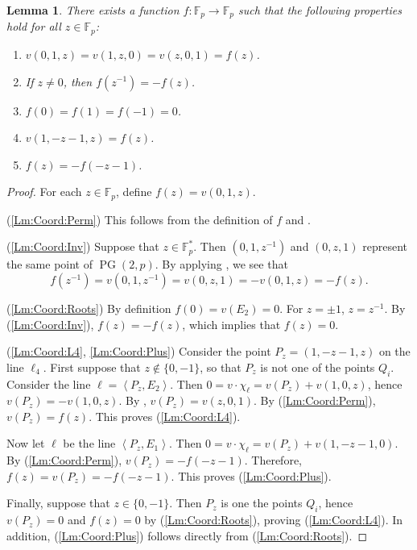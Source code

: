 \documentclass[12pt, a4paper]{article}
\newtheorem{lm}[thm]{Lemma}
\theoremstyle{definition}
\newcommand{\FF}{\mathbb F}
\newcommand{\vspan}[1]{\left \langle #1 \right \rangle}
\DeclareMathOperator{\PG}{PG}
\newcommand{\pg}{\PG}
\begin{document}
\begin{lm}
 \label{Lm:Coord}
 There exists a function $f: \FF_p \to \FF_p$ such that the following properties hold for all $z \in \FF_p$:
 \begin{enumerate}
  \item \label{Lm:Coord:Perm} $v(0,1,z) = v(1,z,0) = v(z,0,1) = f(z)$.
  \item \label{Lm:Coord:Inv} If $z \neq 0$, then $f(z^{-1}) = - f(z)$.
  \item \label{Lm:Coord:Roots} $f(0) = f(1) = f(-1) = 0$.
  \item \label{Lm:Coord:L4} $v(1,-z-1,z) = f(z)$.
  \item \label{Lm:Coord:Plus} $f(z) = -f(-z-1)$.
 \end{enumerate}
\end{lm}

\begin{proof}
 For each $z \in \FF_p$, define $f(z) = v(0,1,z)$.
 
 (\ref{Lm:Coord:Perm}) This follows from the definition of $f$ and .

 (\ref{Lm:Coord:Inv}) Suppose that $z \in \FF_p^*$.
 Then $(0,1,z^{-1})$ and $(0,z,1)$ represent the same point of $\pg(2,p)$.
 By applying , we see that
 \[
  f(z^{-1}) = v(0,1,z^{-1}) = v(0,z,1) = -v(0,1,z) = -f(z).
 \]

 (\ref{Lm:Coord:Roots}) By definition $f(0) = v(E_2) = 0$.
 For $z = \pm 1$, $z = z^{-1}$.
 By (\ref{Lm:Coord:Inv}), $f(z) = -f(z)$, which implies that $f(z) = 0$.

 (\ref{Lm:Coord:L4}, \ref{Lm:Coord:Plus})
 Consider the point $P_z = (1,-z-1,z)$ on the line $\ell_4$.
 First suppose that $z \notin \{0,-1\}$, so that $P_z$ is not one of the points $Q_i$.
 Consider the line $\ell = \vspan{P_z,E_2}$.
 Then $0 = v \cdot \chi_\ell = v(P_z) + v(1,0,z)$, hence $v(P_z) = -v(1,0,z)$.
 By , $v(P_z) = v(z,0,1)$.
 By (\ref{Lm:Coord:Perm}), $v(P_z) = f(z)$.
 This proves (\ref{Lm:Coord:L4}).
 
 Now let $\ell$ be the line $\vspan{P_z,E_1}$.
 Then $0 = v \cdot \chi_\ell = v(P_z) + v(1,-z-1,0)$.
 By (\ref{Lm:Coord:Perm}), $v(P_z) = -f(-z-1)$.
 Therefore, $f(z) = v(P_z) = -f(-z-1)$.
 This proves (\ref{Lm:Coord:Plus}).

 Finally, suppose that $z \in \{0,-1\}$.
 Then $P_z$ is one the points $Q_i$, hence $v(P_z) = 0$ and $f(z) = 0$ by (\ref{Lm:Coord:Roots}), proving (\ref{Lm:Coord:L4}).
 In addition, (\ref{Lm:Coord:Plus}) follows directly from (\ref{Lm:Coord:Roots}).
\end{proof}
\end{document}

